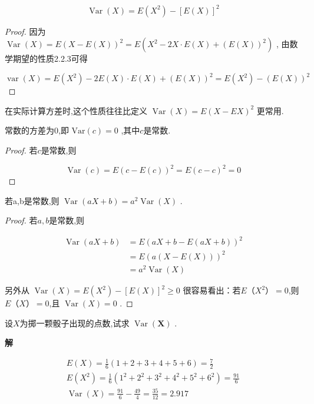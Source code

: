 \begin{property}
	\[
	\operatorname{Var}(X)=E\left(X^{2}\right)-[E(X)]^{2}
	\]
	
	\begin{proof}
		因为 $ \operatorname{Var}(X)=E(X-E(X))^{2}=E\left(X^{2}-2 X \cdot E(X)+(E(X))^{2}\right)$ , 由数学期望的性质2.2.3可得
		
		\[
		\operatorname{var}(X)=E\left(X^{2}\right)-2 E(X) \cdot E(X)+(E(X))^{2}=E\left(X^{2}\right)-(E(X))^{2}
		\]
		
	\end{proof}	
	
	在实际计算方差时,这个性质往往比定义 $\operatorname{Var}(X)=E(X-E X)^{2}$ 更常用.
	
\end{property}

\begin{property}
	常数的方差为0,即 $\mathrm{Var}(c)=0$ ,其中$ c $是常数.
\end{property}

\begin{proof}
	若$ c $是常数,则
	
	\[
	\operatorname{Var}(c)=E(c-E(c))^{2}=E(c-c)^{2}=0
	\]
	
\end{proof}	


\begin{property}
	若a,b是常数,则 $\operatorname{Var}(a X+b)=a^{2} \operatorname{Var}(X)$ .
\end{property}

\begin{proof}
	若$ a,b $是常数,则
	
	\[
	\begin{aligned} \operatorname{Var}(a X+b) &=E(a X+b-E(a X+b))^{2} \\ &=E(a(X-E(X)))^{2} \\ &=a^{2} \operatorname{Var}(X) \end{aligned}
	\]
	
	另外从 $\operatorname{Var}(X)=E\left(X^{2}\right)-[E(X)]^{2} \geqslant 0$ 很容易看出：若$ E（X^2）=0 $,则$ E（X）=0 $,且 $\operatorname{Var}(X)=0$ .
	
\end{proof}

\begin{example}
	设$ X $为掷一颗骰子出现的点数,试求 $\operatorname{Var}(\boldsymbol{X})$ .
	
	\textbf{解}
	
	\[
	\begin{array}{l}{E(X)=\frac{1}{6}(1+2+3+4+5+6)=\frac{7}{2}} \\ {E\left(X^{2}\right)=\frac{1}{6}\left(1^{2}+2^{2}+3^{2}+4^{2}+5^{2}+6^{2}\right)=\frac{91}{6}} \\ {\operatorname{Var}(X)=\frac{91}{6}-\frac{49}{4}=\frac{35}{12}=2.917}\end{array}
	\]
	
\end{example}

